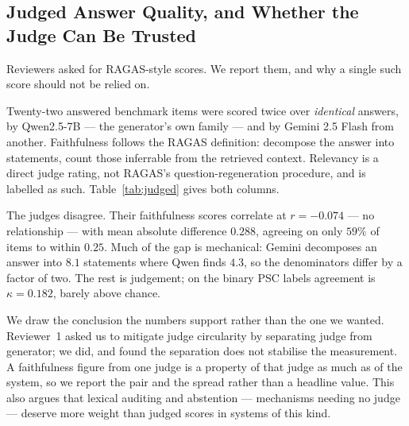 \documentclass[conference]{IEEEtran}
\begin{document}
\subsection{Judged Answer Quality, and Whether the Judge Can Be Trusted}
\label{sec:judged}
Reviewers asked for RAGAS-style scores. We report them, and why a single such
score should not be relied on.

Twenty-two answered benchmark items were scored twice over \emph{identical}
answers, by Qwen2.5-7B --- the generator's own family --- and by Gemini 2.5
Flash from another. Faithfulness follows the RAGAS definition: decompose the
answer into statements, count those inferrable from the retrieved context.
Relevancy is a direct judge rating, not RAGAS's question-regeneration
procedure, and is labelled as such. Table~\ref{tab:judged} gives both columns.

The judges disagree. Their faithfulness scores correlate at $r = -0.074$ --- no
relationship --- with mean absolute difference $0.288$, agreeing on only $59\%$
of items to within $0.25$. Much of the gap is mechanical: Gemini decomposes an
answer into $8.1$ statements where Qwen finds $4.3$, so the denominators differ
by a factor of two. The rest is judgement; on the binary PSC labels agreement
is $\kappa = 0.182$, barely above chance.

We draw the conclusion the numbers support rather than the one we wanted.
Reviewer~1 asked us to mitigate judge circularity by separating judge from
generator; we did, and found the separation does not stabilise the measurement.
A faithfulness figure from one judge is a property of that judge as much as of
the system, so we report the pair and the spread rather than a headline value.
This also argues that lexical auditing and abstention --- mechanisms needing no
judge --- deserve more weight than judged scores in systems of this kind.
\end{document}
